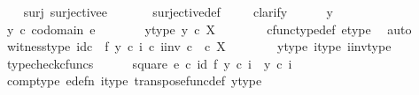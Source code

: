 \begin{isabellebody}
\isanewline
\ \ \isamarkupfalse%
\ surj{\isacharcolon}{\kern0pt}\ {\isachardoublequoteopen}surjective{\isacharparenleft}{\kern0pt}e{\isacharparenright}{\kern0pt}{\isachardoublequoteclose}\isanewline
\ \ \ \ \ \isamarkupfalse%
\ surjective{\isacharunderscore}{\kern0pt}def\isanewline
\ \ \ \isamarkupfalse%
\ clarify\isanewline
\ \ \ \ \isamarkupfalse%
\ y\ \isanewline
\ \ \ \ \isamarkupfalse%
\ {\isachardoublequoteopen}y\ {\isasymin}\isactrlsub c\ codomain\ e{\isachardoublequoteclose}\isanewline
\ \ \ \ \isamarkupfalse%
\ \isamarkupfalse%
\ y{\isacharunderscore}{\kern0pt}type{\isacharcolon}{\kern0pt}\ {\isachardoublequoteopen}y\ {\isasymin}\isactrlsub c\ X{\isachardoublequoteclose}\isanewline
\ \ \ \ \ \ \isamarkupfalse%
\ cfunc{\isacharunderscore}{\kern0pt}type{\isacharunderscore}{\kern0pt}def\ e{\isacharunderscore}{\kern0pt}type\ \isamarkupfalse%
\ auto\isanewline
\isanewline
\ \ \ \ \isamarkupfalse%
\ witness{\isacharunderscore}{\kern0pt}type{\isacharcolon}{\kern0pt}\ {\isachardoublequoteopen}{\isacharparenleft}{\kern0pt}id\isactrlsub c\ {\isasymone}\ {\isasymtimes}\isactrlsub f\ {\isacharparenleft}{\kern0pt}y\ {\isasymcirc}\isactrlsub c\ i{\isacharparenright}{\kern0pt}\isactrlsup {\isasymsharp}{\isacharparenright}{\kern0pt}\ {\isasymcirc}\isactrlsub c\ i{\isacharunderscore}{\kern0pt}inv\ {\isasymin}\isactrlsub c\ {\isasymone}\ {\isasymtimes}\isactrlsub c\ X\isactrlbsup {\isasymone}\isactrlesup {\isachardoublequoteclose}\isanewline
\ \ \ \ \ \ \isamarkupfalse%
\ y{\isacharunderscore}{\kern0pt}type\ i{\isacharunderscore}{\kern0pt}type\ i{\isacharunderscore}{\kern0pt}inv{\isacharunderscore}{\kern0pt}type\ \isamarkupfalse%
\ typecheck{\isacharunderscore}{\kern0pt}cfuncs\isanewline
\isanewline
\ \ \ \ \isamarkupfalse%
\ square{\isacharcolon}{\kern0pt}\ {\isachardoublequoteopen}e\ {\isasymcirc}\isactrlsub c\ {\isacharparenleft}{\kern0pt}id{\isacharparenleft}{\kern0pt}{\isasymone}{\isacharparenright}{\kern0pt}\ {\isasymtimes}\isactrlsub f\ {\isacharparenleft}{\kern0pt}y\ {\isasymcirc}\isactrlsub c\ i{\isacharparenright}{\kern0pt}\isactrlsup {\isasymsharp}{\isacharparenright}{\kern0pt}\ {\isacharequal}{\kern0pt}\ y\ {\isasymcirc}\isactrlsub c\ i{\isachardoublequoteclose}\isanewline
\ \ \ \ \ \ \isamarkupfalse%
\ comp{\isacharunderscore}{\kern0pt}type\ e{\isacharunderscore}{\kern0pt}defn\ i{\isacharunderscore}{\kern0pt}type\ transpose{\isacharunderscore}{\kern0pt}func{\isacharunderscore}{\kern0pt}def\ y{\isacharunderscore}{\kern0pt}type\ \isamarkupfalse%

\end{isabellebody}
